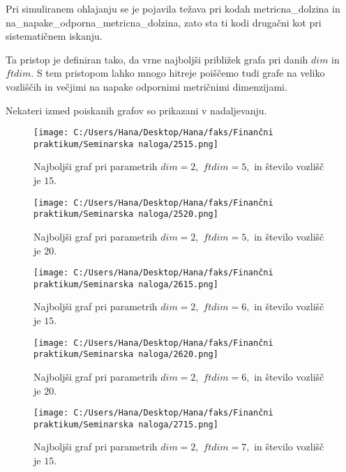 \documentclass[12pt]{article}
\begin{document}
Pri simuliranem ohlajanju se je pojavila težava pri kodah metricna\_dolzina in \\ na\_napake\_odporna\_metricna\_dolzina, zato 
sta ti kodi drugačni kot pri sistematičnem iskanju. 

Ta pristop je definiran tako, da vrne najboljši približek grafa pri danih $dim$ in $ftdim.$ S tem pristopom lahko mnogo hitreje
poiščemo tudi grafe na veliko vozliščih in večjimi na napake odpornimi metričnimi dimenzijami.

Nekateri izmed poiskanih grafov so prikazani v nadaljevanju.


\begin{figure}[H]
    \centering
    \texttt{[image: C:/Users/Hana/Desktop/Hana/faks/Finančni praktikum/Seminarska naloga/2515.png]}
    \caption{Najboljši graf pri parametrih $dim = 2,$ $ftdim = 5,$ in število vozlišč je $15.$}
    \label{fig:slika2515}
\end{figure}

\begin{figure}[H]
    \centering
    \texttt{[image: C:/Users/Hana/Desktop/Hana/faks/Finančni praktikum/Seminarska naloga/2520.png]}
    \caption{Najboljši graf pri parametrih $dim = 2,$ $ftdim = 5,$ in število vozlišč je $20.$}
    \label{fig:slika2520}
\end{figure}


\begin{figure}[H]
    \centering
    \texttt{[image: C:/Users/Hana/Desktop/Hana/faks/Finančni praktikum/Seminarska naloga/2615.png]}
    \caption{Najboljši graf pri parametrih $dim = 2,$ $ftdim = 6,$ in število vozlišč je $15.$}
    \label{fig:slika2615}
\end{figure}

\begin{figure}[H]
    \centering
    \texttt{[image: C:/Users/Hana/Desktop/Hana/faks/Finančni praktikum/Seminarska naloga/2620.png]}
    \caption{Najboljši graf pri parametrih $dim = 2,$ $ftdim = 6,$ in število vozlišč je $20.$}
    \label{fig:slika2620}
\end{figure}



\begin{figure}[H]
    \centering
    \texttt{[image: C:/Users/Hana/Desktop/Hana/faks/Finančni praktikum/Seminarska naloga/2715.png]}
    \caption{Najboljši graf pri parametrih $dim = 2,$ $ftdim = 7,$ in število vozlišč je $15.$}
    \label{fig:slika2715}
\end{figure}
\end{document}
